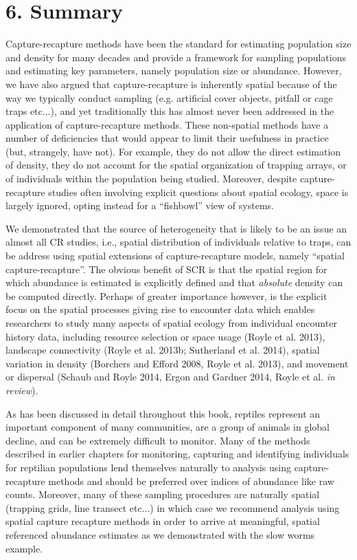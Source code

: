 \documentclass{book}
\begin{document}
\section*{6. Summary}

Capture-recapture methods have been the standard for estimating population size and density for many decades and provide a framework for sampling populations and estimating key parameters, namely population size or abundance. However, we have also argued that capture-recapture is inherently spatial because of the way we typically conduct sampling (e.g. artificial cover objects, pitfall or cage traps etc...), and yet traditionally this has almost never been addressed in the application of capture-recapture methods. These non-spatial methods have a number of deficiencies that would appear to limit their usefulness in practice (but, strangely, have not). For example, they do not allow the direct estimation of density, they do not account for the spatial organization of trapping arrays, or of individuals within the population being studied. Moreover, despite capture-recapture studies often involving
explicit questions about spatial ecology, space is largely ignored, opting instead for a ``fishbowl'' view of systems.

We demonstrated that the source of heterogeneity that is likely to be an issue an almost all CR studies, i.e., spatial distribution of individuals relative to traps, can be address using spatial extensions of capture-recapture models, namely ``spatial capture-recapture''. The obvious benefit of SCR is that the spatial region for which abundance is estimated is explicitly defined and that \textit{absolute} density can be computed directly. Perhaps of greater importance however, is the explicit focus on the spatial processes giving rise to encounter data which enables researchers to study many aspects of spatial ecology from individual encounter history data, including resource selection or space usage (Royle et al. 2013), landscape connectivity (Royle et al. 2013b; Sutherland et al. 2014), spatial variation in density (Borchers and Efford 2008, Royle et al. 2013), and movement or dispersal (Schaub and Royle 2014, Ergon and Gardner 2014, Royle et al. {\it in review}).

As has been discussed in detail throughout this book, reptiles represent an important component of many communities, are a group of animals in global decline, and can be extremely difficult to monitor. Many of the methods described in earlier chapters for monitoring, capturing and identifying individuals for reptilian populations lend themselves naturally to analysis using capture-recapture methods and should be preferred over indices of abundance like raw counts. Moreover, many of these sampling procedures are naturally spatial (trapping grids, line transect etc...) in which case we recommend analysis using spatial capture recapture methods in order to arrive at meaningful, spatial referenced abundance estimates as we demonstrated with the slow worms example.
\end{document}
